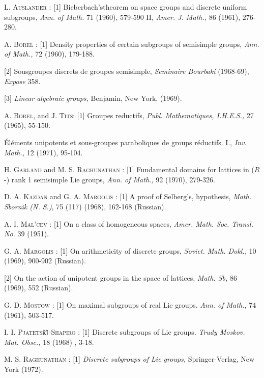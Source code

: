 \begin{thebibliography}{99}
\bibitem{} \textsc{L. Auslander : [1]} Bieberbach's\pageoriginale theorem on space groups and discrete uniform subgroups, \textit{Ann. of Math.} 71 (1960), 579-590 II, \textit{Amer. J. Math.,} 86 (1961), 276-280.

\bibitem{} \textsc{A. Borel : [1]} Density properties of certain subgroups of semisimple groups, \textit{Ann. of Math.,} 72 (1960), 179-188.

\bibitem{} [2] Sousgroupes discrets de groupes semisimple, \textit{Seminaire Bourbaki} (1968-69), \textit{Expose} 358.

\bibitem{} [3] \textit{Linear algebraic groups,} Benjamin, New York, (1969).

\bibitem{} \textsc{A. Borel,} and \textsc{J. Tits:} [1] Groupes reductifs, \textit{Publ. Mathematiques, I.H.E.S.,} 27 (1965), 55-150.

\bibitem{} \'El\'ements unipotents et sous-groupes paraboliques de groups r\'eductifs. I., \textit{Inv. Math.,} 12 (1971), 95-104.

\bibitem{} \textsc{H. Garland} and \textsc{M. S. Raghunathan : [1]} Fundamental domains for lattices in ($R$-) rank 1 semisimple Lie groups, \textit{Ann. of Math.,} 92 (1970), 279-326.

\bibitem{} \textsc{D. A. Kazdan} and \textsc{G. A. Margolis :} [1] A proof of Selberg's, hypothesis, \textit{Math. Sbornik (N. S.)}, 75 (117)  (1968), 162-168 (Russian).

\bibitem{} \textsc{A. I. Mal'cev :} [1] On a class of homogeneous spaces, \textit{Amer. Math. Soc. Transl. No.} 39 (1951).

\bibitem{} \textsc{G. A. Margolis :} [1] On arithmeticity of discrete groups, \textit{Soviet. Math. Dokl., } 10 (1969), 900-902 (Russian).

\bibitem{} [2] On the action of unipotent groups in the space of lattices, \textit{Math. Sb,} 86 (1969), 552 (Russian).

\bibitem{} \textsc{G. D. Mostow : [1]} On maximal subgroups of real Lie groups. \textit{Ann. of Math., } 74 (1961), 503-517.

\bibitem{} \textsc{I. I. Pjatets$\check{\textsc{k}}\check{\textsc{i}}$-Shapiro} : [1] Discrete subgroups of Lie groups. \textit{Trudy Moskov. Mat. Obsc.,} 18 (1968) , 3-18.

\bibitem{} \textsc{M. S. Raghunathan : } [1] \textit{Discrete subgroups of Lie groups,} Springer-Verlag, New York (1972).


\end{thebibliography}
